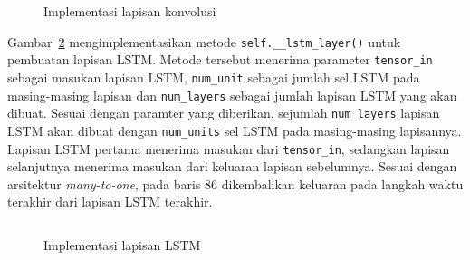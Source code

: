 \begin{figure}[h]
    \inputminted[firstline=50,firstnumber=50,lastline=73,gobble=4]{python}{../har/har.py}
    \caption{Implementasi lapisan konvolusi}
    \label{listing:har-konvolusi}
\end{figure}

Gambar~\ref{listing:har-lstm} mengimplementasikan metode \texttt{self.__lstm_layer()} untuk pembuatan lapisan LSTM\@. Metode tersebut menerima parameter \texttt{tensor_in} sebagai masukan lapisan LSTM, \texttt{num_unit} sebagai jumlah sel LSTM pada masing-masing lapisan dan \texttt{num_layers} sebagai jumlah lapisan LSTM yang akan dibuat. Sesuai dengan paramter yang diberikan, sejumlah \texttt{num_layers} lapisan LSTM akan dibuat dengan \texttt{num_units} sel LSTM pada masing-masing lapisannya. Lapisan LSTM pertama menerima masukan dari \texttt{tensor_in}, sedangkan lapisan selanjutnya menerima masukan dari keluaran lapisan sebelumnya. Sesuai dengan arsitektur \textit{many-to-one}, pada baris $86$ dikembalikan keluaran pada langkah waktu terakhir dari lapisan LSTM terakhir.

\begin{figure}[h]
    \inputminted[firstline=75,firstnumber=75,lastline=86,gobble=4]{python}{../har/har.py}
    \caption{Implementasi lapisan LSTM}
    \label{listing:har-lstm}
\end{figure}







